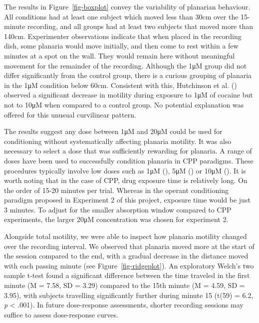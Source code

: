 \documentclass[
  jou,
  floatsintext,
  longtable,
  nolmodern,
  notxfonts,
  notimes,
  donotrepeattitle,
  colorlinks=true,linkcolor=blue,citecolor=blue,urlcolor=blue]{apa7}
\begin{document}
The results in Figure~\ref{fig-boxplot} convey the variability of
planarian behaviour. All conditions had at least one subject which moved
less than 30cm over the 15-minute recording, and all groups had at least
two subjects that moved more than 140cm. Experimenter observations
indicate that when placed in the recording dish, some planaria would
move initially, and then come to rest within a few minutes at a spot on
the wall. They would remain here without meaningful movement for the
remainder of the recording. Although the 1μM group did not differ
significantly from the control group, there is a curious grouping of
planaria in the 1μM condition below 60cm. Consistent with this,
Hutchinson et al. ()
observed a significant decrease in motility during exposure to 1μM of
cocaine but not to 10μM when compared to a control group. No potential
explanation was offered for this unusual curvilinear pattern.

The results suggest any dose between 1μM and 20μM could be used for
conditioning without systematically affecting planaria motility. It was
also necessary to select a dose that was sufficiently rewarding for
planaria. A range of doses have been used to successfully condition
planaria in CPP paradigms. These procedures typically involve low doses
such as 1μM (), 5μM
() or 10μM (). It is worth noting that in the case of CPP, drug exposure
time is relatively long. On the order of 15-20 minutes per trial.
Whereas in the operant conditioning paradigm proposed in Experiment 2 of
this project, exposure time would be just 3 minutes. To adjust for the
smaller absorption window compared to CPP experiments, the larger 20μM
concentration was chosen for experiment 2.

Alongside total motility, we were able to inspect how planaria motility
changed over the recording interval. We observed that planaria moved
more at the start of the session compared to the end, with a gradual
decrease in the distance moved with each passing minute (see
Figure~\ref{fig-ridgeplot}). An exploratory Welch's two sample t-test
found a significant difference between the time traveled in the first
minute (M = 7.58, SD = 3.29) compared to the 15th minute (M = 4.59, SD =
3.95), with subjects travelling significantly further during minute 15
(t(59) = 6.2, \emph{p} \textless{} .001). In future dose-response
assessments, shorter recording sessions may suffice to assess
dose-response curves.
\end{document}
